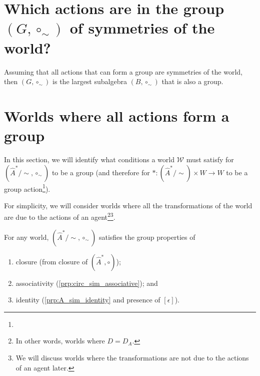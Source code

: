 

\section{Which actions are in the group \texorpdfstring{$(G, \circ_{\sim})$}{} of symmetries of the world?}


Assuming that all actions that can form a group are symmetries of the world, then $(G, \circ_{\sim})$ is the largest subalgebra $(B, \circ_{\sim})$ that is also a group.

\section{Worlds where all actions form a group}

In this section, we will identify what conditions a world $\mathscr{W}$ must satisfy for $(\hat{A}^{*}/\sim, \circ_{\sim})$ to be a group (and therefore for $\ast: (\hat{A}^{*}/\sim) \times W \to W$ to be a group action\footnote{
}).

For simplicity, we will consider worlds where all the transformations of the world are due to the actions of an agent\footnote{In other words, worlds where $D = D_{A}$.}\footnote{We will discuss worlds where the transformations are not due to the actions of an agent later.}.

For any world, $(\hat{A}^{*}/\sim, \circ_{\sim})$ satisfies the group properties of
\begin{enumerate}[(1)]
    \item closure (from closure of $(\hat{A}^{*}, \circ)$);
    \item associativity (\cref{prp:circ_sim_associative}); and
    \item identity (\cref{prp:A_sim_identity} and presence of $[\epsilon]$).
\end{enumerate}

